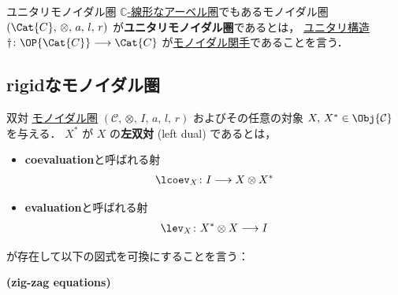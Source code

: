 \documentclass[TQFT_main]{subfiles}
\begin{document}
\begin{mydef}[label=reredef:unitary-monoidal]{ユニタリモノイダル圏}
    \hyperref[def:additive-cat]{$\mathbb{C}$-線形なアーベル圏}でもあるモノイダル圏 $(\Cat{C},\, \otimes ,\, a,\, l,\, r)$ が\textbf{ユニタリモノイダル圏}であるとは，
    \hyperref[redef:unitary]{ユニタリ構造} $\dagger \colon \OP{\Cat{C}} \lto \Cat{C}$ が\hyperref[redef:monidal-functor]{モノイダル関手}であることを言う．
\end{mydef}

\subsection{rigidなモノイダル圏}

\begin{mydef}[label=redef:dual,breakable]{双対}
    \hyperref[redef:monoidal-category]{モノイダル圏} $(\mathcal{C},\, \otimes,\, I,\, a,\, l,\, r)$ およびその任意の対象 $X,\, X^* \in \Obj{\mathcal{C}}$ を与える．
    $X^*$ が $X$ の\textbf{左双対} (left dual) であるとは，
    \begin{itemize}
        \item \textbf{coevaluation}と呼ばれる射
        \begin{align}
            \lcoev_X \colon I \lto X \otimes X^*
        \end{align}
        \item \textbf{evaluation}と呼ばれる射
        \begin{align}
            \lev_X \colon X^* \otimes X \lto I
        \end{align}
    \end{itemize}
    が存在して以下の図式を可換にすることを言う：
    \begin{description}
        \item[\textbf{(zig-zag equations)}]　
        
        \begin{center}
        \end{center}


\end{description}
\end{mydef}
\end{document}
